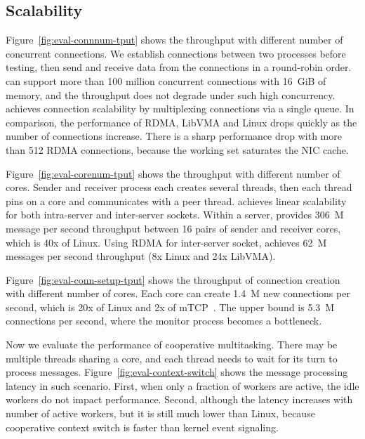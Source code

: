 \subsection{Scalability}


Figure~\ref{fig:eval-connnum-tput} shows the throughput with different number of concurrent connections.
We establish connections between two processes before testing, then send and receive data from the connections in a round-robin order.
\sys can support more than 100 million concurrent connections with 16~GiB of memory, and the throughput does not degrade under such high concurrency.
\sys achieves connection scalability by multiplexing connections via a single queue.
In comparison, the performance of RDMA, LibVMA and Linux drops quickly as the number of connections increase. There is a sharp performance drop with more than 512 RDMA connections, because the working set saturates the NIC cache.




Figure~\ref{fig:eval-corenum-tput} shows the throughput with different number of cores.
Sender and receiver process each creates several threads, then each thread pins on a core and communicates with a peer thread.
\sys achieves linear scalability for both intra-server and inter-server sockets.
Within a server, \sys provides 306~M message per second throughput between 16 pairs of sender and receiver cores, which is 40x of Linux.
Using RDMA for inter-server socket, \sys achieves 62~M messages per second throughput (8x Linux and 24x LibVMA).

Figure~\ref{fig:eval-conn-setup-tput} shows the throughput of connection creation with different number of cores. Each core can create 1.4~M new connections per second, which is 20x of Linux and 2x of mTCP~\cite{jeong2014mtcp}. The upper bound is 5.3~M connections per second, where the monitor process becomes a bottleneck.


Now we evaluate the performance of cooperative multitasking.
There may be multiple threads sharing a core, and each thread needs to wait for its turn to process messages.
Figure~\ref{fig:eval-context-switch} shows the message processing latency in such scenario.
First, when only a fraction of workers are active, the idle workers do not impact performance. 
Second, although the latency increases with number of active workers, but it is still much lower than Linux, because cooperative context switch is faster than kernel event signaling.


